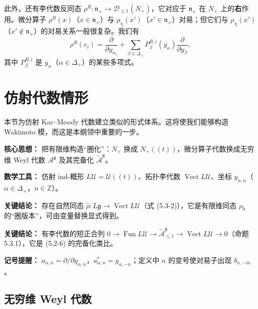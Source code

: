 此外，还有李代数反同态 $\rho^R:\mathfrak{n}_+\to\mathcal{D}_{\le1}(N_+)$，它对应于 $\mathfrak{n}_+$ 在 $N_+$ 上的\textbf{右}作用。微分算子 $\rho^R(x)$（$x\in\mathfrak{n}_+$）与 $\rho_\chi(x')$（$x'\in\mathfrak{n}_+$）对易；但它们与 $\rho_\chi(x')$（$x'\notin\mathfrak{n}_+$）的对易关系一般很复杂。我们有
\[
    \rho^R(e_i)=\frac{\partial}{\partial y_{\alpha_i}}
    +\sum_{\beta\in\Delta_+}P_\beta^{R,i}(y_\alpha)\frac{\partial}{\partial y_\beta},
\]
其中 $P_\beta^{R,i}$ 是 $y_\alpha$（$\alpha\in\Delta_+$）的某些多项式。

\section{仿射代数情形}

本节为仿射 Kac--Moody 代数建立类似的形式体系。这将使我们能够构造 Wakimoto 模，而这是本纲领中重要的一步。

\begin{keypoints}
    \item \textbf{核心思想：} 把有限维构造“圈化”：$N_+$ 换成 $N_+((t))$，微分算子代数换成无穷维 Weyl 代数 $\mathcal{A}^{\mathfrak{g}}$ 及其完备化 $\widetilde{\mathcal{A}}^{\mathfrak{g}}$。
    \item \textbf{数学工具：} 仿射 ind-概形 $L\mathcal{U}=\mathcal{U}((t))$、拓扑李代数 $\operatorname{Vect}L\mathcal{U}$、坐标 $y_{\alpha,n}$（$\alpha\in\Delta_+$，$n\in\mathbb{Z}$）。
    \item \textbf{关键结论：} 存在自然同态 $\widehat{\rho}:L\mathfrak{g}\to\operatorname{Vect}L\mathcal{U}$（式 (5.3-2)），它是有限维同态 $\rho_0$ 的“圈版本”，可由变量替换显式得到。
    \item \textbf{关键结论：} 有李代数的短正合列 $0\to\operatorname{Fun}L\mathcal{U}\to\widetilde{\mathcal{A}}^{\mathfrak{g}}_{\le1}\to\operatorname{Vect}L\mathcal{U}\to0$（命题 5.3.1），它是 (5.2-6) 的完备化类比。
    \item \textbf{记号提醒：} $a_{\alpha,n}=\partial/\partial y_{\alpha,n}$，$a^*_{\alpha,n}=y_{\alpha,-n}$；定义中 $n$ 的变号使对易子出现 $\delta_{n,-m}$。
\end{keypoints}

\subsection{无穷维 Weyl 代数}

